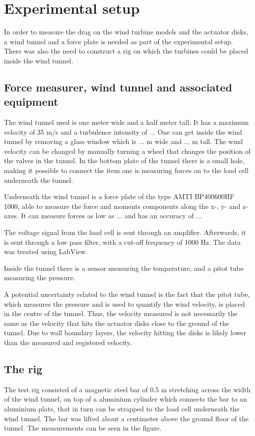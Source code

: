 \section{Experimental setup}

In order to measure the drag on the wind turbine models and the actuator disks, a wind tunnel and a force plate is needed as part of the experimental setup. There was also the need to construct a rig on which the turbines could be placed inside the wind tunnel. 


\subsection{Force measurer, wind tunnel and associated equipment}
The wind tunnel used is one meter wide and a half meter tall. It has a maximum velocity of 35 m/s and a turbulence intensity of ... One can get inside the wind tunnel by removing a glass window which is ... m wide and ... m tall. The wind velocity can be changed by manually turning a wheel that changes the position of the valves in the tunnel. In the bottom plate of the tunnel there is a small hole, making it possible to connect the item one is measuring forces on to the load cell underneath the tunnel.  

Underneath the wind tunnel is a force plate of the type AMTI BP400600HF 1000, able to measure the force and moments components along the x-, y- and z-axes. It can measure forces as low as ... and has an accuracy of ...  

The voltage signal from the load cell is sent through an amplifier. Afterwards, it is sent through a low pass filter, with a cut-off frequency of 1000 Hz. The data was treated using LabView. 

Inside the tunnel there is a sensor measuring the temperature, and a pitot tube measuring the pressure. 

A potential uncertainty related to the wind tunnel is the fact that the pitot tube, which measures the pressure and is used to quantify the wind velocity, is placed in the centre of the tunnel. Thus, the velocity measured is not necessarily the same as the velocity that hits the actuator disks close to the ground of the tunnel. Due to wall boundary layers, the velocity hitting the disks is likely lower than the measured and registered velocity. 


\subsection{The rig} 
The test rig consisted of a magnetic steel bar of 0.5 m stretching across the width of the wind tunnel, on top of a aluminium cylinder which connects the bar to an aluminium plate, that in turn can be strapped to the load cell underneath the wind tunnel. The bar was lifted about a centimeter above the ground floor of the tunnel. The measurements can be seen in the figure. 

